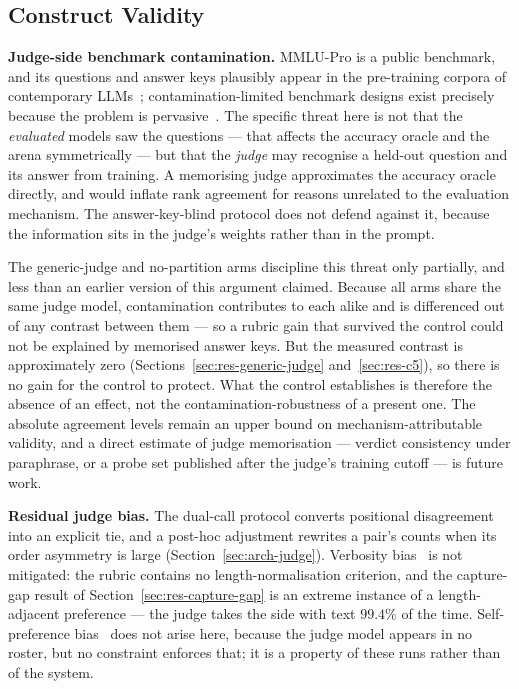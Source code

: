 \subsection{Construct Validity}\label{subsec:disc-construct-validity}

\textbf{Judge-side benchmark contamination.}
MMLU-Pro is a public benchmark, and its questions and answer keys
plausibly appear in the pre-training corpora of contemporary
LLMs~\parencite{deng2024contamination}; contamination-limited benchmark
designs exist precisely because the problem is
pervasive~\parencite{white2024livebench}.
The specific threat here is not that the \emph{evaluated} models saw
the questions --- that affects the accuracy oracle and the arena
symmetrically --- but that the \emph{judge} may recognise a held-out
question and its answer from training. A memorising judge approximates
the accuracy oracle directly, and would inflate rank agreement for
reasons unrelated to the evaluation mechanism. The answer-key-blind
protocol does not defend against it, because the information sits in
the judge's weights rather than in the prompt.

The generic-judge and no-partition arms discipline this threat only
partially, and less than an earlier version of this argument claimed.
Because all arms share the same judge model, contamination contributes
to each alike and is differenced out of any contrast between them --- so
a rubric gain that survived the control could not be explained by
memorised answer keys. But the measured contrast is approximately zero
(Sections~\ref{sec:res-generic-judge} and~\ref{sec:res-c5}), so there is
no gain for the control to protect. What the control establishes is
therefore the absence of an effect, not the contamination-robustness of
a present one. The absolute agreement levels remain an upper bound on
mechanism-attributable validity, and a direct estimate of judge
memorisation --- verdict consistency under paraphrase, or a probe set
published after the judge's training cutoff --- is future work.

\textbf{Residual judge bias.}
The dual-call protocol converts positional disagreement into an
explicit tie, and a post-hoc adjustment rewrites a pair's counts when
its order asymmetry is large (Section~\ref{sec:arch-judge}). Verbosity
bias~\parencite{chen2024verbosity} is not mitigated: the rubric
contains no length-normalisation criterion, and the capture-gap result
of Section~\ref{sec:res-capture-gap} is an extreme instance of a
length-adjacent preference --- the judge takes the side with text
$99.4\%$ of the time. Self-preference
bias~\parencite{panickssery2024llm} does not arise here, because the
judge model appears in no roster, but no constraint enforces that; it
is a property of these runs rather than of the system.


